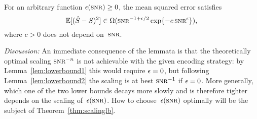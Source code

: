 \begin{lemma}
  \label{lem:lowerbound2}
  For an arbitrary function $\e(\snr) \ge 0$, the mean squared error
  satisfies
  \begin{equation*}
    \mse \in \Omega(\snr^{-1+\e/2} \exp\{-c\snr^\e\}),
  \end{equation*}
  where $c>0$ does not depend on~$\snr$.
\end{lemma}

\emph{Discussion:} An immediate consequence of the lemmata is that the
theoretically optimal scaling $\snr^{-n}$ is not achievable with the given
encoding strategy: by Lemma~\ref{lem:lowerbound1} this would require $\epsilon = 0$,
but following Lemma~\ref{lem:lowerbound2} the scaling is at best $\snr^{-1}$ if
$\epsilon = 0 $.  More generally, which one of the two lower bounds decays more slowly
and is therefore tighter depends on the scaling of~$\e(\snr)$. How to
choose~$\e(\snr)$ optimally will be the subject of Theorem~\ref{thm:scalinglb}.

